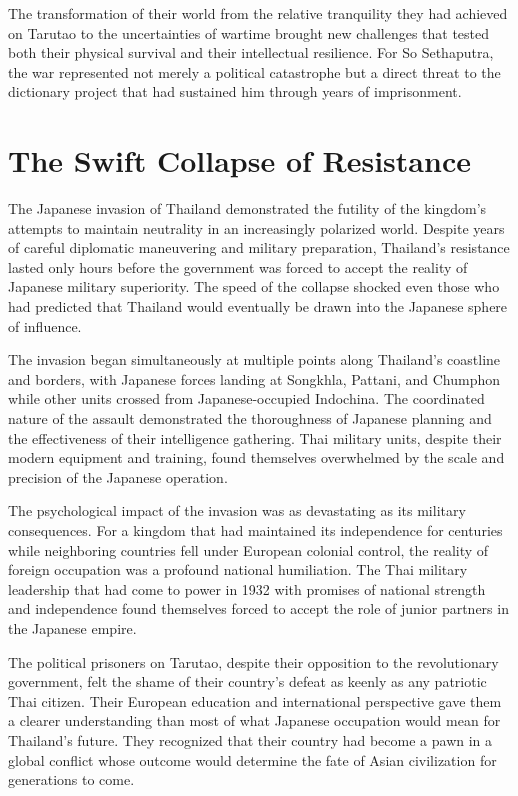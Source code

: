 \documentclass[
  Letterpaper,
]{scrbook}
\begin{document}
The transformation of their world from the relative tranquility they had
achieved on Tarutao to the uncertainties of wartime brought new
challenges that tested both their physical survival and their
intellectual resilience. For So Sethaputra, the war represented not
merely a political catastrophe but a direct threat to the dictionary
project that had sustained him through years of imprisonment.

\section{The Swift Collapse of
Resistance}\label{the-swift-collapse-of-resistance}

The Japanese invasion of Thailand demonstrated the futility of the
kingdom's attempts to maintain neutrality in an increasingly polarized
world. Despite years of careful diplomatic maneuvering and military
preparation, Thailand's resistance lasted only hours before the
government was forced to accept the reality of Japanese military
superiority. The speed of the collapse shocked even those who had
predicted that Thailand would eventually be drawn into the Japanese
sphere of influence.

The invasion began simultaneously at multiple points along Thailand's
coastline and borders, with Japanese forces landing at Songkhla,
Pattani, and Chumphon while other units crossed from Japanese-occupied
Indochina. The coordinated nature of the assault demonstrated the
thoroughness of Japanese planning and the effectiveness of their
intelligence gathering. Thai military units, despite their modern
equipment and training, found themselves overwhelmed by the scale and
precision of the Japanese operation.

The psychological impact of the invasion was as devastating as its
military consequences. For a kingdom that had maintained its
independence for centuries while neighboring countries fell under
European colonial control, the reality of foreign occupation was a
profound national humiliation. The Thai military leadership that had
come to power in 1932 with promises of national strength and
independence found themselves forced to accept the role of junior
partners in the Japanese empire.

The political prisoners on Tarutao, despite their opposition to the
revolutionary government, felt the shame of their country's defeat as
keenly as any patriotic Thai citizen. Their European education and
international perspective gave them a clearer understanding than most of
what Japanese occupation would mean for Thailand's future. They
recognized that their country had become a pawn in a global conflict
whose outcome would determine the fate of Asian civilization for
generations to come.
\end{document}
